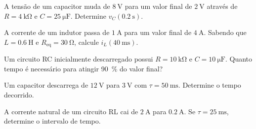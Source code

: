 \blocoaplicacao

\begin{questao}[2]{}
A tensão de um capacitor muda de $\SI{8}{\volt}$ para um valor final de
$\SI{2}{\volt}$ através de $R=\SI{4}{\kilo\ohm}$ e
$C=\SI{25}{\micro\farad}$. Determine $v_C(\SI{0.2}{\second})$.
\end{questao}

\begin{questao}[2]{}
A corrente de um indutor passa de $\SI{1}{\ampere}$ para um valor final de
$\SI{4}{\ampere}$. Sabendo que $L=\SI{0.6}{\henry}$ e
$R_{\mathrm{eq}}=\SI{30}{\ohm}$, calcule $i_L(\SI{40}{\milli\second})$.
\end{questao}

\begin{questao}[2]{}
Um circuito RC inicialmente descarregado possui $R=\SI{10}{\kilo\ohm}$ e
$C=\SI{10}{\micro\farad}$. Quanto tempo é necessário para atingir
\SI{90}{\percent} do valor final?
\end{questao}

\begin{questao}[2]{}
Um capacitor descarrega de $\SI{12}{\volt}$ para $\SI{3}{\volt}$ com
$\tau=\SI{50}{\milli\second}$. Determine o tempo decorrido.
\end{questao}

\begin{questao}[2]{}
A corrente natural de um circuito RL cai de $\SI{2}{\ampere}$ para
$\SI{0.2}{\ampere}$. Se $\tau=\SI{25}{\milli\second}$, determine o intervalo de
tempo.
\end{questao}


